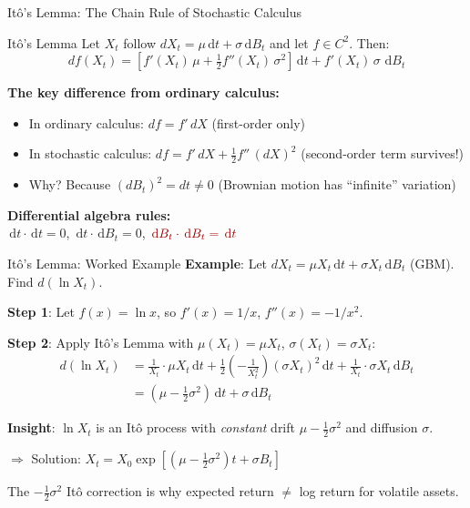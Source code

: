 \documentclass[aspectratio=169,11pt]{beamer}
\newcommand{\emphc}[1]{\textcolor{harvardcrimson}{#1}}
\newcommand{\ud}{\,\mathrm{d}}
\begin{document}
\begin{frame}{It\^o's Lemma: The Chain Rule of Stochastic Calculus}
\begin{block}{It\^o's Lemma}
Let $X_t$ follow $dX_t = \mu\ud t + \sigma\ud B_t$ and let $f \in C^2$. Then:
\[
\boxed{df(X_t) = \left[f'(X_t)\,\mu + \tfrac{1}{2}f''(X_t)\,\sigma^2\right]\ud t + f'(X_t)\,\sigma\,\ud B_t}
\]
\end{block}

\vspace{0.2em}
\textbf{The key difference from ordinary calculus:}
\begin{itemize}\itemsep2pt
    \item In ordinary calculus: $df = f'\,dX$ \quad (first-order only)
    \item In stochastic calculus: $df = f'\,dX + \frac{1}{2}f''\,(dX)^2$ \quad (second-order term survives!)
    \item Why? Because $(dB_t)^2 = dt \neq 0$ (Brownian motion has ``infinite'' variation)
\end{itemize}

\vspace{0.3em}
\begin{center}
\colorbox{uzhgreylight}{\parbox{0.7\textwidth}{\centering
\textbf{Differential algebra rules:}\\[4pt]
$\ud t \cdot \ud t = 0$, \qquad $\ud t \cdot \ud B_t = 0$, \qquad $\emphc{\ud B_t \cdot \ud B_t = \ud t}$
}}
\end{center}
\end{frame}

\begin{frame}{It\^o's Lemma: Worked Example}
\textbf{Example}: Let $dX_t = \mu X_t\ud t + \sigma X_t\ud B_t$ (GBM). Find $d(\ln X_t)$.

\vspace{0.3em}
\textbf{Step 1}: Let $f(x) = \ln x$, so $f'(x) = 1/x$, $f''(x) = -1/x^2$.

\vspace{0.2em}
\textbf{Step 2}: Apply It\^o's Lemma with $\mu(X_t) = \mu X_t$, $\sigma(X_t) = \sigma X_t$:
\begin{align*}
d(\ln X_t) &= \frac{1}{X_t}\cdot \mu X_t\ud t + \frac{1}{2}\left(-\frac{1}{X_t^2}\right)(\sigma X_t)^2\ud t + \frac{1}{X_t}\cdot \sigma X_t \ud B_t \\[6pt]
&= \boxed{\left(\mu - \tfrac{1}{2}\sigma^2\right)\ud t + \sigma\ud B_t}
\end{align*}

\vspace{0.2em}
\textbf{Insight}: $\ln X_t$ is an It\^o process with \emph{constant} drift $\mu - \frac{1}{2}\sigma^2$ and diffusion $\sigma$.

\vspace{0.2em}
$\Rightarrow$ Solution: $X_t = X_0 \exp\!\left[\left(\mu - \tfrac{1}{2}\sigma^2\right)t + \sigma B_t\right]$

\vspace{0.2em}
{\small The $-\frac{1}{2}\sigma^2$ \emphc{It\^o correction} is why expected return $\neq$ log return for volatile assets.}
\end{frame}
\end{document}
